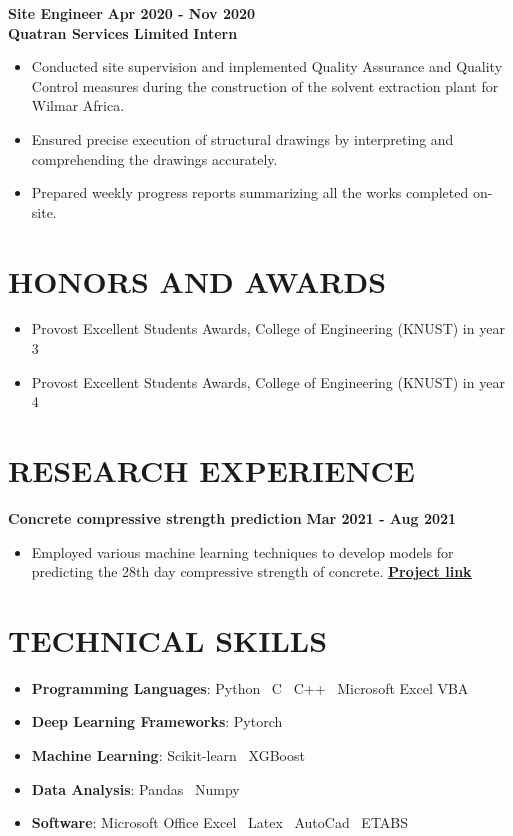 \documentclass[letterpaper, 12pt]{article}
\newcommand{\cvsection}[1]{
	
	\section*{#1}
}
\newcommand{\verticalSpace}{4pt}
\begin{document}
	\textbf{Site Engineer} \hfill \textbf{Apr 2020 - Nov 2020} \\ [\verticalSpace]
	\textbf{Quatran Services Limited} \hfill \textbf{Intern}
	
	\begin{itemize}[leftmargin=*]
		
		\item Conducted site supervision and implemented Quality Assurance and Quality Control measures during the construction of the solvent extraction plant for Wilmar Africa.	
		\item Ensured precise execution of structural drawings by interpreting and comprehending the drawings accurately.
		\item Prepared weekly progress reports summarizing all the works completed on-site.
		
	\end{itemize}
	
	
	\cvsection{HONORS AND AWARDS}
	
	\begin{itemize}[leftmargin=*]
		
		\item Provost Excellent Students Awards, College of Engineering (KNUST) in year 3
		\item Provost Excellent Students Awards, College of Engineering (KNUST) in year 4
		
	\end{itemize}
	
	
	\cvsection{RESEARCH EXPERIENCE}
	
	\textbf{Concrete compressive strength prediction} \hfill \textbf{Mar 2021 - Aug 2021}
	
	\begin{itemize}[leftmargin=*]
		
		\item Employed various machine learning techniques to develop models for predicting the 28th day compressive strength of concrete. \href{https://www.github.com/patrickboateng/compressive-strength-prediction}{\underline{\textbf{Project link}}}
		
	\end{itemize}
	
	
	\cvsection{TECHNICAL SKILLS}
	
	\begin{itemize}[leftmargin=*]
		
		\item \textbf{Programming Languages}: Python \vrule \, C \vrule \, C++ \vrule \, Microsoft Excel VBA
		\item \textbf{Deep Learning Frameworks}: Pytorch
		\item \textbf{Machine Learning}: Scikit-learn \vrule \, XGBoost
		\item \textbf{Data Analysis}: Pandas \vrule \, Numpy
		\item \textbf{Software}: Microsoft Office Excel \vrule \, Latex \vrule \, AutoCad \vrule \, ETABS
		
	\end{itemize}
	
\end{document}
